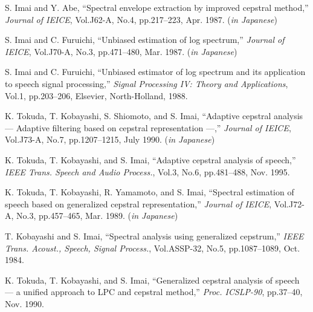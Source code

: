 \begin{thebibliography}{99}


S. Imai and Y. Abe,
``Spectral envelope extraction by improved cepstral method,''
{\sl Journal of IEICE},
 Vol.J62-A, No.4, pp.217--223, Apr. 1987. ({\sl in Japanese})



S. Imai and C. Furuichi,
``Unbiased estimation of log spectrum,''
{\sl Journal of IEICE}, 
Vol.J70-A, No.3, pp.471--480, Mar. 1987. ({\sl in Japanese})

S. Imai and C. Furuichi,
``Unbiased estimator of log spectrum
  and its application to speech signal processing,''
{\sl Signal Processing IV: Theory and Applications},
  Vol.1, pp.203--206, Elsevier, North-Holland, 1988.

K. Tokuda, T. Kobayashi, S. Shiomoto, and S. Imai,
``Adaptive cepstral analysis --- Adaptive filtering based on cepstral representation ---,''
{\sl Journal of IEICE},
Vol.J73-A, No.7, pp.1207--1215, July 1990. ({\sl in Japanese})

K. Tokuda, T. Kobayashi, and S. Imai,
``Adaptive cepstral analysis of speech,''
{\sl IEEE Trans. Speech and Audio Process.}, 
Vol.3, No.6, pp.481--488, Nov. 1995.



K. Tokuda, T. Kobayashi, R. Yamamoto, and S. Imai,
``Spectral estimation of speech based on generalized cepstral representation,''
{\sl Journal of IEICE},
Vol.J72-A, No.3, pp.457--465, Mar. 1989. ({\sl in Japanese})

T. Kobayashi and S. Imai,
``Spectral analysis using generalized cepstrum,''
{\sl IEEE Trans. Acoust., Speech, Signal Process.},
  Vol.ASSP-32, No.5, pp.1087--1089, Oct. 1984.

K. Tokuda, T. Kobayashi, and S. Imai,
``Generalized cepstral analysis of speech --- a unified approach to LPC and cepstral method,''
{\sl Proc. ICSLP-90}, %
  pp.37--40, 
  Nov. 1990.


\end{thebibliography}
